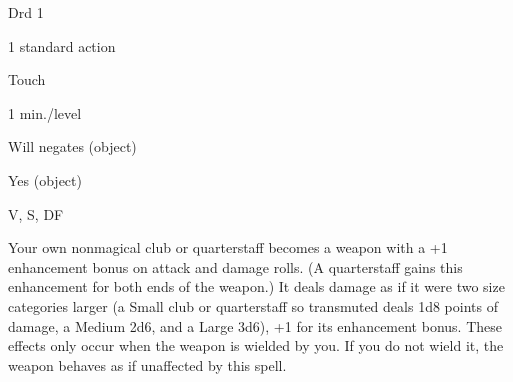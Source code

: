 
\begin{description*}
\item[Level:] Drd 1
\item[Casting Time:] 1 standard action
\item[Range:] Touch
\item[Duration:] 1 min./level
\item[Saving Throw:] Will negates (object)
\item[Spell Resistance:] Yes (object)
\item[Components:] V, S, DF
\end{description*}

Your own nonmagical club or quarterstaff becomes a weapon with a +1 enhancement
bonus on attack and damage rolls. (A quarterstaff gains this enhancement for both
ends of the weapon.) It deals damage as if it were two size categories larger (a
Small club or quarterstaff so transmuted deals 1d8 points of damage, a Medium 2d6,
and a Large 3d6), +1 for its enhancement bonus. These effects only occur when the
weapon is wielded by you. If you do not wield it, the weapon behaves as if unaffected
by this spell.